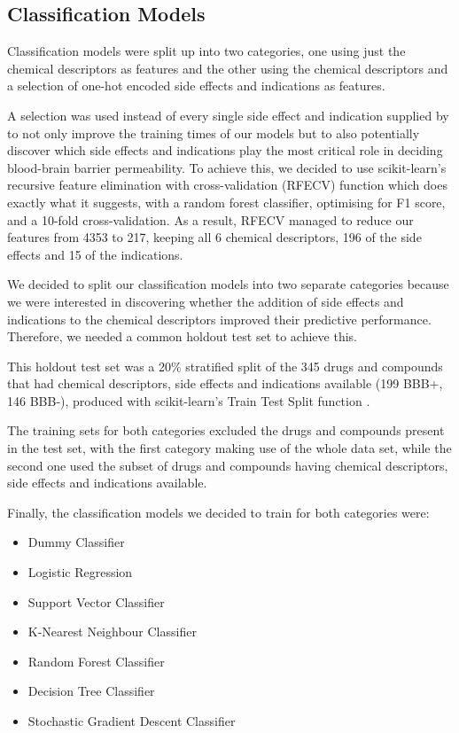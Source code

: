 \subsection{Classification Models}
\label{subsec:Classification_Models}

Classification models were split up into two categories, one using just the chemical descriptors as features and the other using the chemical descriptors and a selection of one-hot encoded side effects and indications as features.

A selection was used instead of every single side effect and indication supplied by \citet{SIDER} to not only improve the training times of our models but to also potentially discover which side effects and indications play the most critical role in deciding blood-brain barrier permeability. To achieve this, we decided to use scikit-learn's recursive feature elimination with cross-validation (RFECV) function \citep{RFECV} which does exactly what it suggests, with a random forest classifier, optimising for F1 score, and a 10-fold cross-validation. As a result, RFECV managed to reduce our features from 4353 to 217, keeping all 6 chemical descriptors, 196 of the side effects and 15 of the indications.

We decided to split our classification models into two separate categories because we were interested in discovering whether the addition of side effects and indications to the chemical descriptors improved their predictive performance. Therefore, we needed a common holdout test set to achieve this.

This holdout test set was a 20\%  stratified split of the 345 drugs and compounds that had chemical descriptors, side effects and indications available (199 BBB+, 146 BBB-), produced with scikit-learn's Train Test Split function \citep{TrainTestSplit}. 

The training sets for both categories excluded the drugs and compounds present in the test set, with the first category making use of the whole data set, while the second one used the subset of drugs and compounds having chemical descriptors, side effects and indications available.

Finally, the classification models we decided to train for both categories were:
\begin{itemize}
    \item 
    Dummy Classifier
    \item 
    Logistic Regression
    \item 
    Support Vector Classifier
    \item 
    K-Nearest Neighbour Classifier
    \item 
    Random Forest Classifier
    \item 
    Decision Tree Classifier
    \item 
    Stochastic Gradient Descent Classifier
\end{itemize}

